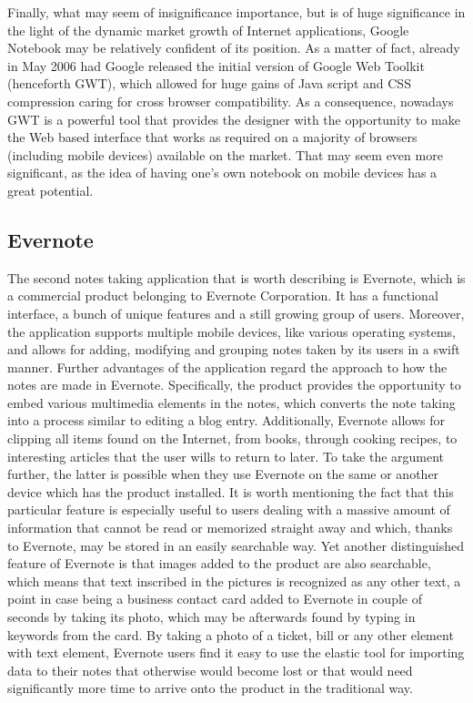 Finally, what may seem of insignificance importance, but is of huge significance in the light of the dynamic market growth of Internet applications, Google Notebook may be relatively confident of its position. As a matter of fact, already in May 2006 had Google released the initial version of Google Web Toolkit (henceforth GWT), which allowed for huge gains of Java script and CSS compression caring for cross browser compatibility. As a consequence, nowadays GWT is a powerful tool that provides the designer with the opportunity to make the Web based interface that works as required on a majority of browsers (including mobile devices) available on the market. That may seem even more significant, as the idea of having one's own notebook on mobile devices has a great potential. 

\subsection{Evernote}\label{subsec:evernote}
The second notes taking application that is worth describing is Evernote, which is a commercial product belonging to Evernote Corporation. It has a functional interface, a bunch of unique features and a still growing group of users. Moreover, the application supports multiple mobile devices, like various operating systems, and allows for adding, modifying and grouping notes taken by its users in a swift manner. Further advantages of the application regard the approach to how the notes are made in Evernote. Specifically, the product provides the opportunity to embed various multimedia elements in the notes, which converts the note taking into a process similar to editing a blog entry. Additionally, Evernote allows for clipping all items found on the Internet, from books, through cooking recipes, to interesting articles that the user wills to return to later. To take the argument further, the latter is possible when they use Evernote on the same or another device which has the product installed. It is worth mentioning the fact that this particular feature is especially useful to users dealing with a massive amount of information that cannot be read or memorized straight away and which, thanks to Evernote, may be stored in an easily searchable way. Yet another distinguished feature of Evernote is that images added to the product are also searchable, which means that text inscribed in the pictures is recognized as any other text, a point in case being a business contact card added to Evernote in couple of seconds by taking its photo, which may be afterwards found by typing in keywords from the card. By taking a photo of a ticket, bill or any other element with text element, Evernote users find it easy to use the elastic tool for importing data to their notes that otherwise would become lost or that would need significantly more time to arrive onto the product in the traditional way.


